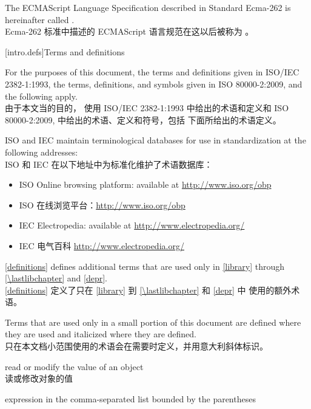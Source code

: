 \pnum
The ECMAScript Language Specification described in Standard Ecma-262 is
hereinafter called . \\
Ecma-262 标准中描述的 ECMAScript 语言规范在这以后被称为 。

[intro.defs]{Terms and definitions}

\pnum
{}%
For the purposes of this document,
the terms and definitions
given in ISO/IEC 2382-1:1993,
the terms, definitions, and symbols
given in ISO 80000-2:2009,
and the following apply. \\
由于本文当的目的，
使用 ISO/IEC 2382-1:1993 中给出的术语和定义和 
ISO 80000-2:2009, 中给出的术语、定义和符号，包括
下面所给出的术语定义。

\pnum
ISO and IEC maintain terminological databases
for use in standardization
at the following addresses:\\
ISO 和 IEC 在以下地址中为标准化维护了术语数据库：
\begin{itemize}
\item ISO Online browsing platform: available at \url{http://www.iso.org/obp}
\item ISO 在线浏览平台：\url{http://www.iso.org/obp}
\item IEC Electropedia: available at \url{http://www.electropedia.org/}
\item IEC 电气百科 \url{http://www.electropedia.org/}
\end{itemize}

\pnum
\ref{definitions}
defines additional terms that are used only in \ref{library}
through \ref{\lastlibchapter} and \ref{depr}. \\
\ref{definitions}
定义了只在 \ref{library} 到 \ref{\lastlibchapter} 和 \ref{depr} 中
使用的额外术语。

\pnum
Terms that are used only in a small portion of this document
are defined where they are used and italicized where they are
defined. \\
只在本文档小范围使用的术语会在需要时定义，并用意大利斜体标识。

%
 read or modify the value of an object \\
读或修改对象的值

%
 expression in the
comma-separated list bounded by the parentheses

